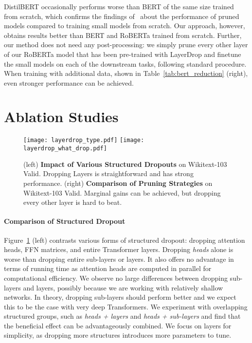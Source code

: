DistilBERT occasionally performs worse than BERT of the same size trained from scratch, which confirms the findings of~\citet{liu2018rethinking} about the performance of pruned models compared to training small models from scratch.
Our approach, however, obtains results better than BERT and RoBERTa trained from scratch.
Further, our method does not need any post-processing: we simply prune every other layer of our RoBERTa model that has been pre-trained with LayerDrop and finetune the small models on each of the downstream tasks, following standard procedure. When training with additional data, shown in Table~\ref{tab:bert_reduction} (right), even stronger performance can be achieved.

\section{Ablation Studies}

\begin{figure}[t]
    \centering
\texttt{[image: layerdrop\_type.pdf]} \hspace{-1.2em}
    \texttt{[image: layerdrop\_what\_drop.pdf]}
    \caption{(left) \textbf{Impact of Various Structured Dropouts} on Wikitext-103 Valid. Dropping Layers is straightforward and has strong performance. (right) \textbf{Comparison of Pruning Strategies} on Wikitext-103 Valid. Marginal gains can be achieved, but dropping every other layer is hard to beat.
}
    \label{fig:ablation_3}
\end{figure}


\paragraph{Comparison of Structured Dropout}

Figure~\ref{fig:ablation_3} (left) contrasts various forms of structured dropout: dropping attention heads, FFN matrices, and entire Transformer layers.
Dropping \textit{heads} alone is worse than dropping entire sub-layers or layers.
It also offers no advantage in terms of running time as attention heads are computed in parallel for computational efficiency.
We observe no large differences between dropping sub-layers and layers, possibly because we are working with relatively shallow networks.
In theory, dropping sub-layers should perform better and we expect this to be the case with very deep Transformers.
We experiment with overlapping structured groups, such as \textit{heads + layers} and \textit{heads + sub-layers} and find that the beneficial effect can be advantageously combined. We focus on layers for simplicity, as dropping more  structures introduces more parameters to tune.

